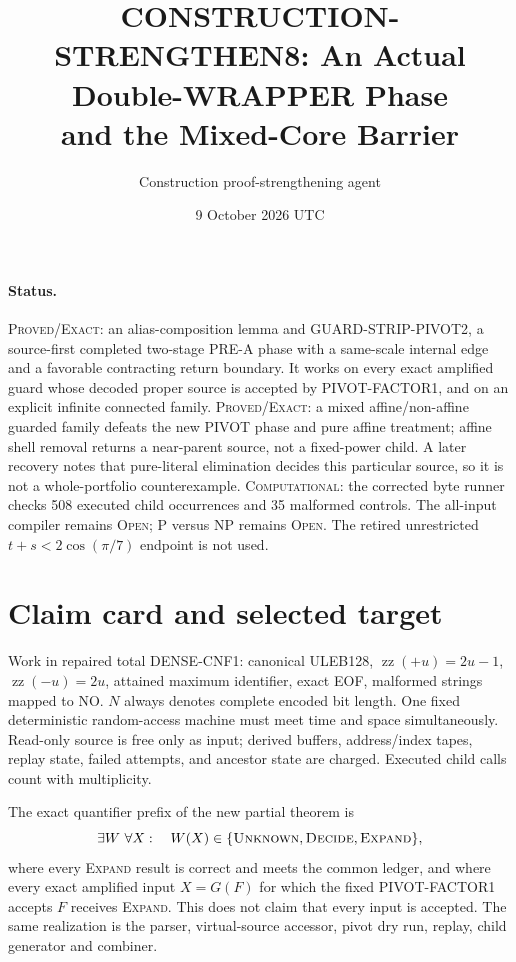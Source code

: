 \documentclass[11pt]{article}
\title{CONSTRUCTION-STRENGTHEN8: An Actual Double-WRAPPER Phase\\and the Mixed-Core Barrier}
\author{Construction proof-strengthening agent}
\date{9 October 2026 UTC}
\begin{document}
\sloppy\maketitle

\paragraph{Status.}
\textsc{Proved/Exact}: an alias-composition lemma and
\textsc{GUARD-STRIP-PIVOT2}, a source-first completed two-stage PRE-A phase
with a same-scale internal edge and a favorable contracting return boundary.
It works on every exact amplified guard whose decoded proper source is
accepted by \textsc{PIVOT-FACTOR1}, and on an explicit infinite connected
family.  \textsc{Proved/Exact}: a mixed affine/non-affine guarded family
defeats the new PIVOT phase and pure affine treatment; affine shell removal
returns a near-parent source, not a fixed-power child.  A later recovery notes
that pure-literal elimination decides this particular source, so it is not a
whole-portfolio counterexample.  \textsc{Computational}:
the corrected byte runner checks 508 executed child occurrences and 35
malformed controls.  The all-input compiler remains \textsc{Open}; P versus
NP remains \textsc{Open}.  The retired unrestricted
$t+s<2\cos(\pi/7)$ endpoint is not used.

\section{Claim card and selected target}
Work in repaired total DENSE-CNF1: canonical ULEB128,
$\operatorname{zz}(+u)=2u-1$, $\operatorname{zz}(-u)=2u$, attained maximum
identifier, exact EOF, malformed strings mapped to NO.  $N$ always denotes
complete encoded bit length.  One fixed deterministic random-access machine
must meet time and space simultaneously.  Read-only source is free only as
input; derived buffers, address/index tapes, replay state, failed attempts,
and ancestor state are charged.  Executed child calls count with multiplicity.

The exact quantifier prefix of the new partial theorem is
\[
 \exists W\ \forall X:\quad W(X)\in\{\textsc{Unknown},\textsc{Decide},
 \textsc{Expand}\},
\]
where every \textsc{Expand} result is correct and meets the common ledger,
and where every exact amplified input $X=G(F)$ for which the fixed
\textsc{PIVOT-FACTOR1} accepts $F$ receives \textsc{Expand}.  This does not
claim that every input is accepted.  The same realization is the parser,
virtual-source accessor, pivot dry run, replay, child generator and combiner.
\end{document}
